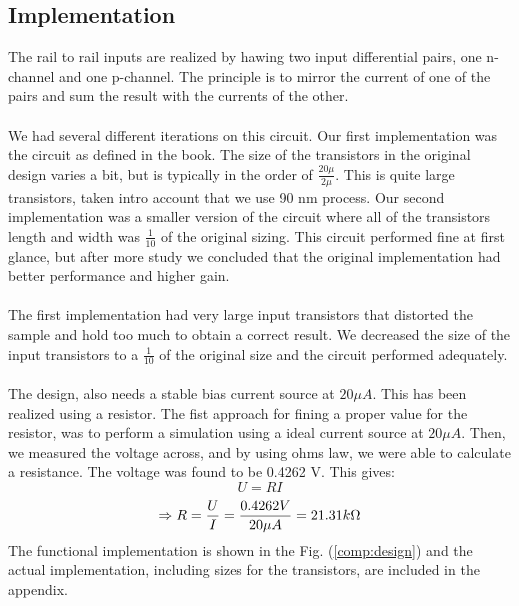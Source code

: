 \documentclass[english, 12pt, a4paper]{ifimaster}
\begin{document}
\subsection{Implementation}
The rail to rail inputs are realized by hawing two input differential pairs, one n-channel and one p-channel.
The principle is to mirror the current of one of the pairs and sum the result with the currents of the other.\\
\\
We had several different iterations on this circuit.
Our first implementation was the circuit as defined in the book. The size of the transistors in the original design varies a bit, but is typically in the order of 
\( \frac{20\mu}{2\mu} \). This is quite large transistors, taken intro account that we use 90 nm process. 
Our second implementation was a smaller version of the circuit where all of the transistors length and width was \( \frac{1}{10} \) of the original sizing. 
This circuit performed fine at first glance, but after more study we concluded that the original implementation had better performance and higher gain.\\ 
\\
The first implementation had very large input transistors that distorted the sample and hold too much to obtain a correct result.
We decreased the size of the input transistors to a \( \frac{1}{10} \) of the original size and the circuit performed adequately.\\
\\
The design, also needs a stable bias current source at \(20 \mu A\). This has been realized using a resistor. The fist approach for fining a proper value for the resistor,
was to perform a simulation using a ideal current source at \(20 \mu A\). Then, we measured the voltage across, and by using ohms law, we were able to calculate a resistance.
The voltage was found to be 0.4262 V. This gives:
\begin{equation}
 U = RI
\end{equation}
\begin{equation}
 \Rightarrow R = \frac{U}{I} = \frac{0.4262 V}{20 \mu A} = 21.31 k\ohm	
\end{equation}
\newline
The functional implementation is shown in the Fig. (\ref{comp:design}) and the actual implementation, including sizes for the transistors, are included in the appendix.
\end{document}

